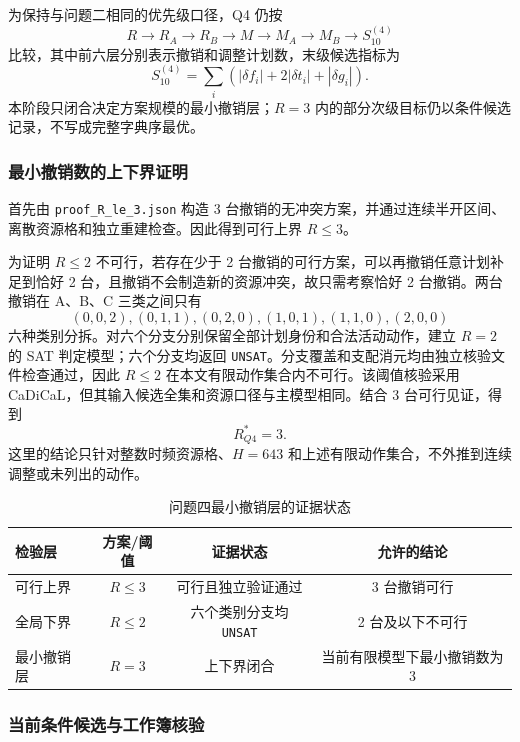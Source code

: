 为保持与问题二相同的优先级口径，Q4 仍按
\[
R\rightarrow R_A\rightarrow R_B\rightarrow M\rightarrow M_A\rightarrow M_B\rightarrow S_{10}^{(4)}
\]
比较，其中前六层分别表示撤销和调整计划数，末级候选指标为
\begin{equation}
S_{10}^{(4)}=\sum_i\left(|\delta f_i|+2|\delta t_i|+|\delta g_i|\right).
\label{eq:q4-shift-score}
\end{equation}
本阶段只闭合决定方案规模的最小撤销层；\(R=3\) 内的部分次级目标仍以条件候选记录，不写成完整字典序最优。

\subsubsection{最小撤销数的上下界证明}

首先由 \texttt{proof\_R\_le\_3.json} 构造 3 台撤销的无冲突方案，并通过连续半开区间、离散资源格和独立重建检查。因此得到可行上界 \(R\le3\)。

为证明 \(R\le2\) 不可行，若存在少于 2 台撤销的可行方案，可以再撤销任意计划补足到恰好 2 台，且撤销不会制造新的资源冲突，故只需考察恰好 2 台撤销。两台撤销在 A、B、C 三类之间只有
\[
(0,0,2),(0,1,1),(0,2,0),(1,0,1),(1,1,0),(2,0,0)
\]
六种类别分拆。对六个分支分别保留全部计划身份和合法活动动作，建立 \(R=2\) 的 SAT 判定模型；六个分支均返回 \texttt{UNSAT}。分支覆盖和支配消元均由独立核验文件检查通过，因此 \(R\le2\) 在本文有限动作集合内不可行。该阈值核验采用 CaDiCaL\cite{cadical}，但其输入候选全集和资源口径与主模型相同。结合 3 台可行见证，得到
\begin{equation}
R_{Q4}^{\ast}=3.
\label{eq:q4-min-revoke}
\end{equation}
这里的结论只针对整数时频资源格、\(H=643\) 和上述有限动作集合，不外推到连续调整或未列出的动作。

\begin{table}[H]
\centering
\caption{问题四最小撤销层的证据状态}
\label{tab:q4-proof}
\begin{tabular}{lccc}
\toprule
检验层 & 方案/阈值 & 证据状态 & 允许的结论 \\
\midrule
可行上界 & \(R\le3\) & 可行且独立验证通过 & 3 台撤销可行 \\
全局下界 & \(R\le2\) & 六个类别分支均 \texttt{UNSAT} & 2 台及以下不可行 \\
最小撤销层 & \(R=3\) & 上下界闭合 & 当前有限模型下最小撤销数为 3 \\
\bottomrule
\end{tabular}
\end{table}

\subsubsection{当前条件候选与工作簿核验}

